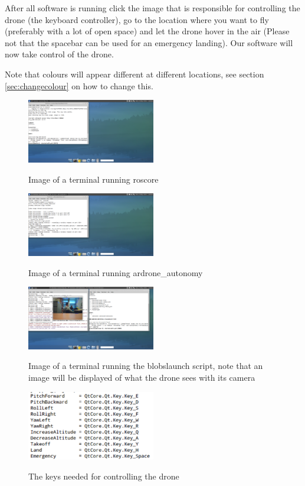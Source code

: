 \documentclass[a4paper,10pt]{article}
\begin{document}
After all software is running click the image that is responsible for controlling the drone (the keyboard controller), go to the location where you want to fly (preferably with a lot of open space) and let the drone hover in the air (Please not that the spacebar can be used for an emergency landing).
Our software will now take control of the drone. 

Note that colours will appear different at different locations, see section \ref{sec:changecolour} on how to change this. 
\begin{figure}[h!]
	\caption{Image of a terminal running roscore}
	\centering
	\includegraphics[width=0.5\textwidth]{images/roscore}
	\label{fig:roscore}
\end{figure}


\begin{figure}[h!]
	\caption{Image of a terminal running ardrone\_autonomy}
	\centering
	\includegraphics[width=0.5\textwidth]{images/ardrone_autonomy}
	\label{fig:ardrone_autonomy}
\end{figure}


\begin{figure}[h!]
	\caption{Image of a terminal running the blobslaunch script, note that an image will be displayed of what the drone sees with its camera}
	\centering
	\includegraphics[width=0.5\textwidth]{images/blobslaunch}
	\label{fig:blobslaunch}
\end{figure}

\begin{figure}[h!]
	\caption{The keys needed for controlling the drone}
	\centering
	\includegraphics[width=0.5\textwidth]{images/keysforcontrol}
	\label{fig:keysforcontrol}
\end{figure}
\end{document}

